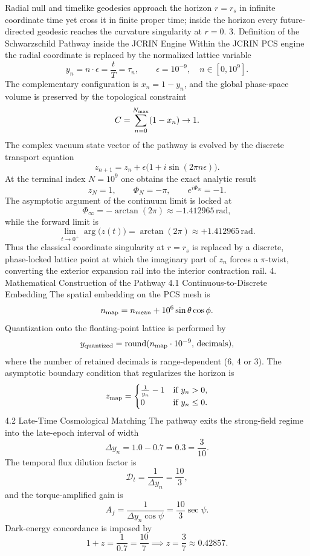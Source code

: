 Radial null and timelike geodesics approach the horizon \(r = r_s\) in infinite coordinate time yet cross it in finite proper time; inside the horizon every future-directed geodesic reaches the curvature singularity at \(r = 0\).
3. Definition of the Schwarzschild Pathway inside the JCRIN Engine
Within the JCRIN PCS engine the radial coordinate is replaced by the normalized lattice variable
\[
y_n = n\cdot\epsilon = \frac{t}{T} = \tau_n, \qquad \epsilon = 10^{-9},\quad n\in[0,10^9].
\]
The complementary configuration is \(x_n = 1 - y_n\), and the global phase-space volume is preserved by the topological constraint
\[
C = \sum_{n=0}^{N_{\rm max}}(1 - x_n)\to 1.
\]
The complex vacuum state vector of the pathway is evolved by the discrete transport equation
\[
z_{n+1} = z_n + \epsilon\bigl(1 + i\sin(2\pi n\epsilon)\bigr).
\]
At the terminal index \(N = 10^9\) one obtains the exact analytic result
\[
z_N = 1, \qquad \Phi_N = -\pi, \qquad e^{i\Phi_N} = -1.
\]
The asymptotic argument of the continuum limit is locked at
\[
\Phi_\infty = -\arctan(2\pi) \approx -1.412965\,\text{rad},
\]
while the forward limit is
\[
\lim_{t\to 0^+}\arg\bigl(z(t)\bigr) = \arctan(2\pi) \approx +1.412965\,\text{rad}.
\]
Thus the classical coordinate singularity at \(r = r_s\) is replaced by a discrete, phase-locked lattice point at which the imaginary part of \(z_n\) forces a \(\pi\)-twist, converting the exterior expansion rail into the interior contraction rail.
4. Mathematical Construction of the Pathway
4.1 Continuous-to-Discrete Embedding
The spatial embedding on the PCS mesh is
\[
n_{\rm map} = n_{\rm mean} + 10^6\sin\theta\cos\phi.
\]
Quantization onto the floating-point lattice is performed by
\[
y_{\rm quantized} = {\rm round}(n_{\rm map}\cdot 10^{-9},\,{\rm decimals}),
\]
where the number of retained decimals is range-dependent (6, 4 or 3). The asymptotic boundary condition that regularizes the horizon is
\[
z_{\rm map} = 
\begin{cases}
\frac{1}{y_n}-1 & \text{if }y_n>0,\\
0 & \text{if }y_n\le 0.
\end{cases}
\]
4.2 Late-Time Cosmological Matching
The pathway exits the strong-field regime into the late-epoch interval of width
\[
\Delta y_n = 1.0 - 0.7 = 0.3 = \frac{3}{10}.
\]
The temporal flux dilution factor is
\[
\mathcal{D}_t = \frac{1}{\Delta y_n} = \frac{10}{3},
\]
and the torque-amplified gain is
\[
A_f = \frac{1}{\Delta y_n\cos\psi} = \frac{10}{3}\sec\psi.
\]
Dark-energy concordance is imposed by
\[
1+z = \frac{1}{0.7} = \frac{10}{7}\implies z = \frac{3}{7}\approx 0.42857.
\]
